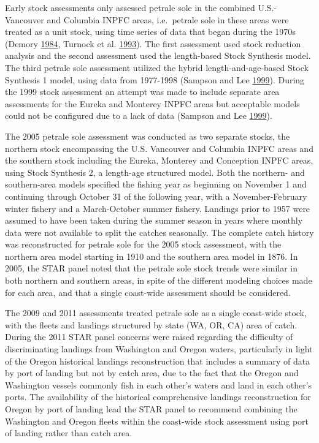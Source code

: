 \documentclass[12pt,]{article}
\begin{document}
Early stock assessments only assessed petrale sole in the combined
U.S.-Vancouver and Columbia INPFC areas, i.e.~petrale sole in these
areas were treated as a unit stock, using time series of data that began
during the 1970s (Demory
\protect\hyperlink{ref-demory_progress_1984}{1984}, Turnock et al.
\protect\hyperlink{ref-turnock_status_1993}{1993}). The first assessment
used stock reduction analysis and the second assessment used the
length-based Stock Synthesis model. The third petrale sole assessment
utilized the hybrid length-and-age-based Stock Synthesis 1 model, using
data from 1977-1998 (Sampson and Lee
\protect\hyperlink{ref-sampson_assessment_1999}{1999}). During the 1999
stock assessment an attempt was made to include separate area
assessments for the Eureka and Monterey INPFC areas but acceptable
models could not be configured due to a lack of data (Sampson and Lee
\protect\hyperlink{ref-sampson_assessment_1999}{1999}).

The 2005 petrale sole assessment was conducted as two separate stocks,
the northern stock encompassing the U.S. Vancouver and Columbia INPFC
areas and the southern stock including the Eureka, Monterey and
Conception INPFC areas, using Stock Synthesis 2, a length-age structured
model. Both the northern- and southern-area models specified the fishing
year as beginning on November 1 and continuing through October 31 of the
following year, with a November-February winter fishery and a
March-October summer fishery. Landings prior to 1957 were assumed to
have been taken during the summer season in years where monthly data
were not available to split the catches seasonally. The complete catch
history was reconstructed for petrale sole for the 2005 stock
assessment, with the northern area model starting in 1910 and the
southern area model in 1876. In 2005, the STAR panel noted that the
petrale sole stock trends were similar in both northern and southern
areas, in spite of the different modeling choices made for each area,
and that a single coast-wide assessment should be considered.

The 2009 and 2011 assessments treated petrale sole as a single
coast-wide stock, with the fleets and landings structured by state (WA,
OR, CA) area of catch. During the 2011 STAR panel concerns were raised
regarding the difficulty of discriminating landings from Washington and
Oregon waters, particularly in light of the Oregon historical landings
reconstruction that includes a summary of data by port of landing but
not by catch area, due to the fact that the Oregon and Washington
vessels commonly fish in each other's waters and land in each other's
ports. The availability of the historical comprehensive landings
reconstruction for Oregon by port of landing lead the STAR panel to
recommend combining the Washington and Oregon fleets within the
coast-wide stock assessment using port of landing rather than catch
area.
\end{document}
